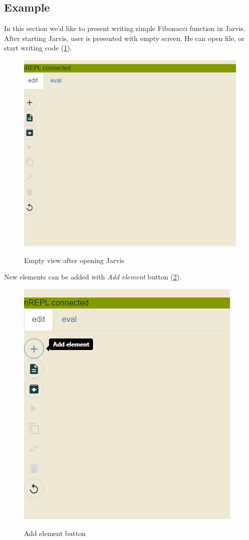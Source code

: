 \documentclass[11pt]{scrartcl}
\begin{document}
\subsection{Example}
In this section we'd like to present writing simple Fibonacci function in Jarvis.
After starting Jarvis, user is presented with empty screen. He can open file, or
start writing code (\ref{j-startup}). 

\begin{figure}[hbt]
  \includegraphics[scale=0.3]{img/j-startup}
  \label{j-startup}
  \caption{Empty view after opening Jarvis}
\end{figure}

New elements can be added with \textit{Add element} button (\ref{j-add}).

\begin{figure}
  \includegraphics[scale=0.3]{img/j-add}
  \label{j-add}
  \caption{Add element button}
\end{figure}
\end{document}
